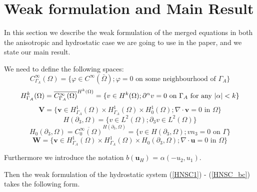 \documentclass[11pt]{article}
\begin{document}
\section{Weak formulation and Main Result} \label{weakformulationmainresult}

In this section we describe the weak formulation of the merged equations in both the anisotropic and hydrostatic case we are going to use in the paper, and we state our main result.

We need to define the following spaces:
%
\[ C^{\infty}_{\Gamma_A} (\Omega) = \{ \varphi \in C^\infty (\bar{\Omega}); \varphi = 0 \text{ on some neighbourhood of } \Gamma_A \} \]
%
\[ H^k_{\Gamma_A} (\Omega) = \overline{C_{\Gamma_A} ^ \infty (\Omega)} ^ {H^k (\Omega)} = \{ v \in H^k(\Omega); \partial^\alpha v=0 \text{ on } \Gamma_A \text{ for any } \abs{\alpha} < k \} \]
%
\[ \mathbf{V} = \{ \mathbf{v} \in H^1_{\Gamma_A} (\Omega) \times H^1_{\Gamma_A} (\Omega) \times H^1_0 (\Omega); \nabla \cdot \mathbf{v} = 0 \text{ in } \Omega \} \]
%
\[ H (\partial_3, \Omega) = \{ v \in L^2(\Omega); \partial_3 v \in L^2 (\Omega)\} \]
%
\[ H_0 (\partial_3, \Omega) = \overline{C_0 ^\infty (\Omega)}^{H (\partial_3, \Omega)} = \{ v \in H(\partial_3, \Omega); v n_3 = 0 \text{ on } \Gamma \} \]
%
\[ \mathbf{W} = \{ \mathbf{v} \in H^1_{\Gamma_A} (\Omega) \times H^1_{\Gamma_A} (\Omega) \times H_0 (\partial_3, \Omega); \nabla \cdot \mathbf{u} = 0 \text{ in } \Omega \} \]

Furthermore we introduce the notation $b(\mathbf{u}_H)$ = $\alpha (-u_2 , u_1).$

Then the weak formulation of the hydrostatic system (\ref{HNSC1}) - (\ref{HNSC_bc}) takes the following form.
\end{document}
